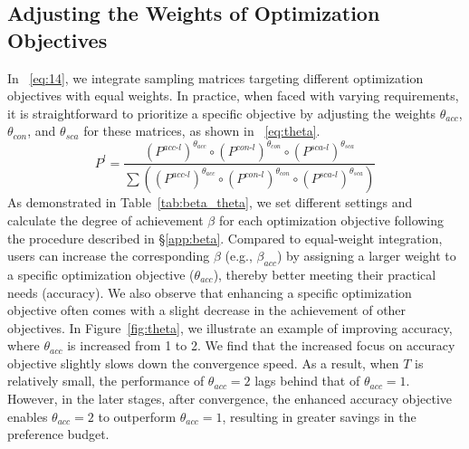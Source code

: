 \subsection{Adjusting the Weights of Optimization Objectives}
In ~\eqref{eq:14}, we integrate sampling matrices targeting different optimization objectives with equal weights. In practice, when faced with varying requirements, it is straightforward to prioritize a specific objective by adjusting the weights \(\theta_{acc}\), \(\theta_{con}\), and \(\theta_{sca}\) for these matrices, as shown in ~\eqref{eq:theta}. 
\begin{equation}
    P^{l} = \frac{(P^{acc\text{-}l})^{\theta_{acc}} \circ (P^{con\text{-}l})^{\theta_{con}}  \circ (P^{sca\text{-}l})^{\theta_{sca}} }{\sum ((P^{acc\text{-}l})^{\theta_{acc}} \circ (P^{con\text{-}l})^{\theta_{con}}  \circ (P^{sca\text{-}l})^{\theta_{sca}})}
    \label{eq:theta}
\end{equation}
As demonstrated in Table~\ref{tab:beta_theta}, we set different settings and calculate the degree of achievement \(\beta\) for each optimization objective following the procedure described in \S\ref{app:beta}. Compared to equal-weight integration, users can increase the corresponding \(\beta\) (e.g., \(\beta_{acc}\)) by assigning a larger weight to a specific optimization objective (\(\theta_{acc}\)), thereby better meeting their practical needs (accuracy).
We also observe that enhancing a specific optimization objective often comes with a slight decrease in the achievement of other objectives. In Figure~\ref{fig:theta}, we illustrate an example of improving accuracy, where \(\theta_{acc}\) is increased from 1 to 2. We find that the increased focus on accuracy objective slightly slows down the convergence speed. As a result, when \(T\) is relatively small, the performance of \(\theta_{acc} = 2\) lags behind that of \(\theta_{acc} = 1\). However, in the later stages, after convergence, the enhanced accuracy objective enables \(\theta_{acc} = 2\) to outperform \(\theta_{acc} = 1\), resulting in greater savings in the preference budget.
